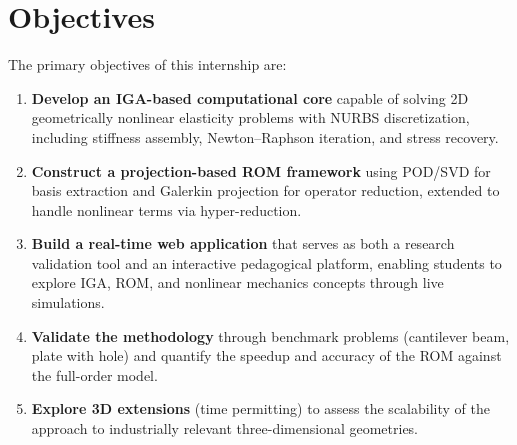 \section*{Objectives}

The primary objectives of this internship are:

\begin{enumerate}
    \item \textbf{Develop an IGA-based computational core} capable of solving 2D geometrically nonlinear elasticity problems with NURBS discretization, including stiffness assembly, Newton--Raphson iteration, and stress recovery.
    
    \item \textbf{Construct a projection-based ROM framework} using POD/SVD for basis extraction and Galerkin projection for operator reduction, extended to handle nonlinear terms via hyper-reduction.
    
    \item \textbf{Build a real-time web application} that serves as both a research validation tool and an interactive pedagogical platform, enabling students to explore IGA, ROM, and nonlinear mechanics concepts through live simulations.
    
    \item \textbf{Validate the methodology} through benchmark problems (cantilever beam, plate with hole) and quantify the speedup and accuracy of the ROM against the full-order model.
    
    \item \textbf{Explore 3D extensions} (time permitting) to assess the scalability of the approach to industrially relevant three-dimensional geometries.
\end{enumerate}
